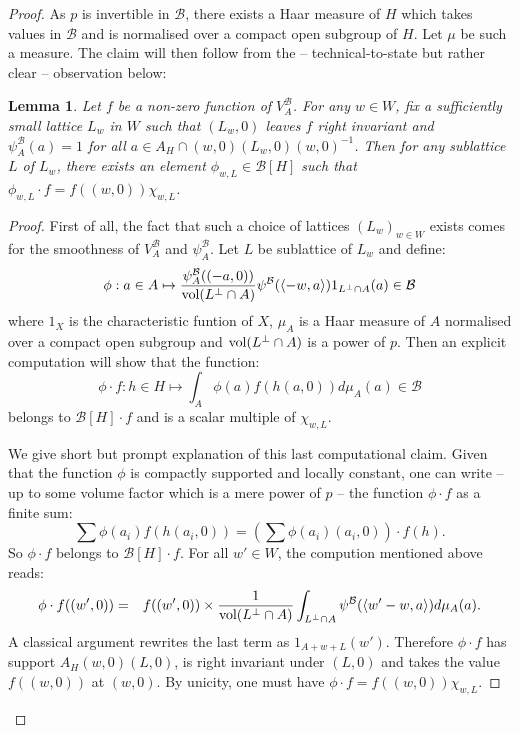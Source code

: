 \documentclass[11pt]{article}
\theoremstyle{plain}
\newtheorem{lem}[theo]{Lemma}
\theoremstyle{definition}
\theoremstyle{plain}
\theoremstyle{definition}
\theoremstyle{plain}
\begin{document}
\begin{proof}
As $p$ is invertible in $\mathcal{B}$, there exists a Haar measure of $H$ which takes values in $\mathcal{B}$ and is normalised over a compact open subgroup of $H$. Let $\mu$ be such a measure. The claim will then follow from the -- technical-to-state but rather clear -- observation below:

\begin{lem} \label{metaplectic_rep_small_lemma} Let $f$ be a non-zero function of $V_A^\mathcal{B}$. For any $w \in W$, fix a sufficiently small lattice $L_w$ in $W$ such that $(L_w,0)$ leaves $f$ right invariant and $\psi_A^\mathcal{B}(a)=1$ for all $a \in A_H \cap (w,0) (L_w,0) (w,0)^{-1}$. Then for any sublattice $L$ of $L_w$, there exists an element $\phi_{w,L} \in \mathcal{B}[H]$ such that $\phi_{w,L} \cdot f = f((w,0)) \chi_{w,L}$.  \end{lem}

\begin{proof} First of all, the fact that such a choice of lattices $(L_w)_{w \in W}$ exists comes for the smoothness of $V_A^\mathcal{B}$ and $\psi_A^\mathcal{B}$. Let $L$ be sublattice of $L_w$ and define:
$$\phi : a \in A \mapsto \frac{\psi_A^\mathcal{B}((-a,0))}{\textup{vol}(L^\perp \cap A)} \psi^\mathcal{B}(\langle -w , a \rangle) 1_{L^\perp \cap A}(a) \in \mathcal{B}$$
where $1_X$ is the characteristic funtion of $X$, $\mu_A$ is a Haar measure of $A$ normalised over a compact open subgroup and $\textup{vol}(L^\perp \cap A)$ is a power of $p$. Then an explicit computation will show that the function:
$$\phi \cdot f : h \in H \mapsto \int_A \phi(a) f(h(a,0)) d \mu_A(a) \in \mathcal{B}$$
belongs to $\mathcal{B}[H] \cdot f$ and is a scalar multiple of $\chi_{w,L}$.

We give short but prompt explanation of this last computational claim. Given that the function $\phi$ is compactly supported and locally constant, one can write -- up to some volume factor which is a mere power of $p$ -- the function $\phi \cdot f$ as a finite sum:
$$\sum \phi(a_i) f(h(a_i,0)) = \left(\sum \phi(a_i) (a_i,0)\right) \cdot f (h).$$
So $\phi \cdot f$ belongs to $\mathcal{B}[H] \cdot f$.  For all $w' \in W$, the compution mentioned above reads:
\begin{eqnarray*} 
\phi \cdot f((w',0))& = & f((w',0)) \times \frac{1}{\textup{vol}(L^\perp \cap A)}  \int_{L^\perp \cap A} \psi^\mathcal{B}(\langle w'-w,a \rangle ) d \mu_A(a).
\end{eqnarray*}
A classical argument rewrites the last term as $1_{A+w+L}(w')$. Therefore $\phi \cdot f$ has support $A_H(w,0)(L,0)$, is right invariant under $(L,0)$ and takes the value $f((w,0))$ at $(w,0)$. By unicity, one must have $\phi \cdot f = f((w,0)) \chi_{w,L}$. \end{proof}


\end{proof}
\end{document}
